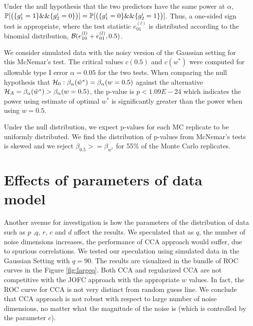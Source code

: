 \documentclass[12pt,oneside,final]{thesis}\usepackage[]{graphicx}\usepackage[]{color}
\begin{document}
Under the null  hypothesis that the two predictors have the same power at $\alpha$,
 $\mathbb{P}[\left(\{g_1^{i}=1\} \&\& \{g_2^{i}=0\}\right)]=\mathbb{P}[\left(\{g_1^{i}=0\} \&\& \{g_2^{i}=1\}\right)]$. Thus, a one-sided sign test is appropriate,  where the test statistic $e_{01}^{(l)}$ is distributed according to  the binomial distribution, $\mathcal{B}(e_{10}^{(l)}+e_{01}^{(l)},0.5)$. 

We consider simulated data with the noisy version of the Gaussian setting for this McNemar's test. The critical values $c(0.5)$ and $c(w^*)$ were computed for  allowable type I error $\alpha=0.05$ for the two tests. When comparing  the null hypothesis that  $\mathcal{H}_{0}: \beta_{\alpha}({\hat{w}^*})=\beta_{\alpha}({w=0.5})$ against the alternative $\mathcal{H}_{A}=\beta_{\alpha}({\hat{w}^*})>\beta_{\alpha}({w=0.5})$, the p-value is $p<1.09E-24$ which indicates the power using estimate of optimal $w^*$ is significantly greater than the power when using $w=0.5$.

Under the null distribution, we expect p-values for each MC replicate to be uniformly distributed. We find
 the distribution of p-values from McNemar's tests  is skewed and  we reject $\beta_{0.5}>=\beta_{w^*} $ for  55\%  of the Monte Carlo replicates.

\section{Effects of parameters of data model }
 Another avenue for investigation is  how the parameters of the distribution of  data such as $p$ ,$q$, $r$, $c$ and $d$ affect the results. We speculated  that as $q$, the number of   noise dimensions increases, the performance of  CCA approach would suffer, due to spurious correlations. We tested  our speculation using simulated data in the Gaussian Setting with $q=90$. The results are visualized in the  bundle of ROC curves in the Figure \ref{fig:largeq}.  Both CCA and  regularized CCA are not competitive with the JOFC approach with the appropriate $w$ values. In fact, the ROC curve for CCA is not very distinct from  random guess line. We conclude that CCA approach is not robust with respect to large number of noise dimensions, no matter what the magnitude  of the noise  is (which is controlled by the parameter $c$).
\end{document}
